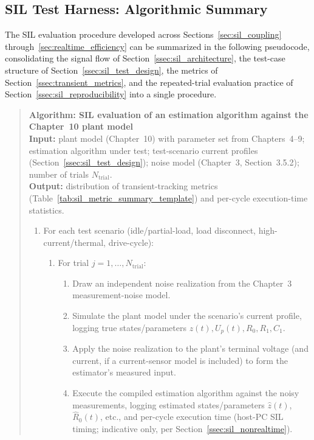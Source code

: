 \subsection{SIL Test Harness: Algorithmic Summary}
\label{ssec:sil_harness_pseudocode}

The SIL evaluation procedure developed across Sections~\ref{sec:sil_coupling} through~\ref{sec:realtime_efficiency} can be summarized in the following pseudocode, consolidating the signal flow of Section~\ref{ssec:sil_architecture}, the test-case structure of Section~\ref{ssec:sil_test_design}, the metrics of Section~\ref{ssec:transient_metrics}, and the repeated-trial evaluation practice of Section~\ref{ssec:sil_reproducibility} into a single procedure.

\begin{quote}
\textbf{Algorithm: SIL evaluation of an estimation algorithm against the Chapter~10 plant model} \\[2pt]
\textbf{Input:} plant model (Chapter~10) with parameter set from Chapters~4--9; estimation algorithm under test; test-scenario current profiles (Section~\ref{ssec:sil_test_design}); noise model (Chapter~3, Section~3.5.2); number of trials $N_{\text{trial}}$. \\
\textbf{Output:} distribution of transient-tracking metrics (Table~\ref{tab:sil_metric_summary_template}) and per-cycle execution-time statistics.
\begin{enumerate}
	\item For each test scenario (idle/partial-load, load disconnect, high-current/thermal, drive-cycle):
	\begin{enumerate}
		\item For trial $j = 1, \dots, N_{\text{trial}}$:
		\begin{enumerate}
			\item Draw an independent noise realization from the Chapter~3 measurement-noise model.
			\item Simulate the plant model under the scenario's current profile, logging true states/parameters $z(t), U_p(t), R_0, R_1, C_1$.
			\item Apply the noise realization to the plant's terminal voltage (and current, if a current-sensor model is included) to form the estimator's measured input.
			\item Execute the compiled estimation algorithm against the noisy measurements, logging estimated states/parameters $\hat{z}(t)$, $\hat{R}_0(t)$, etc., and per-cycle execution time (host-PC SIL timing; indicative only, per Section~\ref{ssec:sil_nonrealtime}).

\end{enumerate}
\end{enumerate}
\end{enumerate}
\end{quote}
